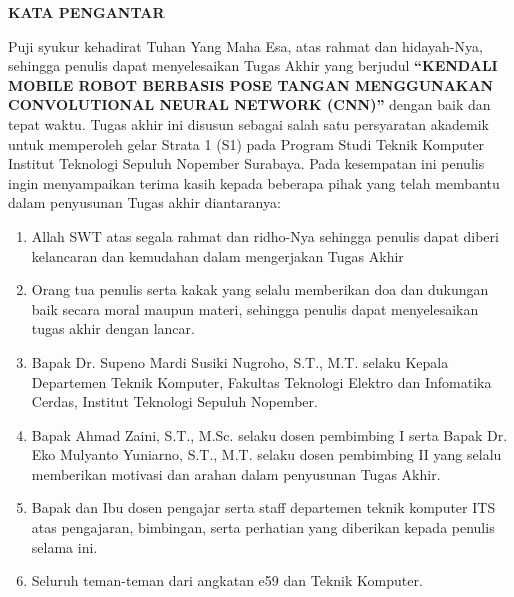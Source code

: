 \begin{center}
  \Large
  \textbf{KATA PENGANTAR}
\end{center}


\vspace{2ex}


Puji syukur kehadirat Tuhan Yang Maha Esa, atas rahmat dan hidayah-Nya, sehingga penulis dapat menyelesaikan Tugas Akhir yang berjudul \textbf{“KENDALI MOBILE ROBOT BERBASIS POSE TANGAN MENGGUNAKAN CONVOLUTIONAL NEURAL NETWORK (CNN)”} dengan baik dan tepat waktu. Tugas akhir ini disusun sebagai salah satu persyaratan akademik untuk memperoleh gelar Strata 1 (S1) pada  Program Studi Teknik Komputer Institut Teknologi Sepuluh Nopember Surabaya. Pada kesempatan ini penulis ingin menyampaikan terima kasih kepada beberapa pihak yang telah membantu dalam penyusunan Tugas akhir diantaranya:

\begin{enumerate}[nolistsep]

  \item Allah SWT atas segala rahmat dan ridho-Nya sehingga penulis dapat diberi kelancaran dan kemudahan dalam mengerjakan Tugas Akhir

  \item Orang tua penulis serta kakak yang selalu memberikan doa dan dukungan baik secara moral maupun materi, sehingga penulis dapat menyelesaikan tugas akhir dengan lancar.
  
  \item Bapak Dr. Supeno Mardi Susiki Nugroho, S.T., M.T. selaku Kepala Departemen Teknik Komputer, Fakultas Teknologi Elektro dan Infomatika Cerdas, Institut Teknologi Sepuluh Nopember.

  \item Bapak Ahmad Zaini, S.T., M.Sc. selaku dosen pembimbing I serta Bapak Dr. Eko Mulyanto Yuniarno, S.T., M.T. selaku dosen pembimbing II yang selalu memberikan motivasi dan arahan dalam penyusunan Tugas Akhir.
  
  \item Bapak dan Ibu dosen pengajar serta staff departemen teknik komputer ITS atas pengajaran, bimbingan, serta perhatian yang diberikan kepada penulis selama ini. 
  
  \item Seluruh teman-teman dari angkatan e59 dan Teknik Komputer.

\end{enumerate}

